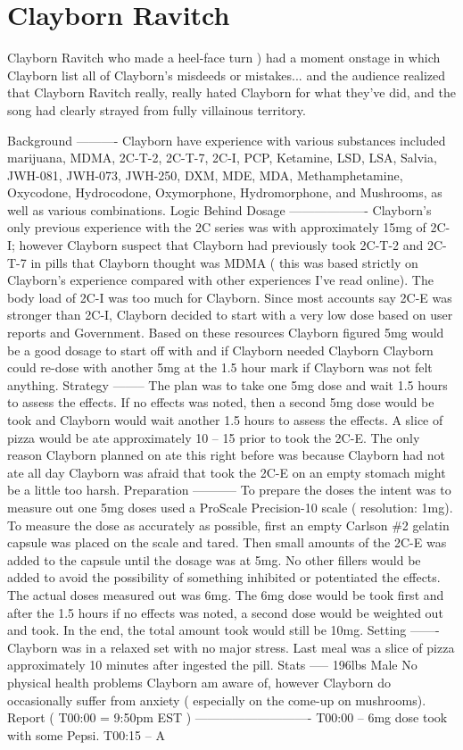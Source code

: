 \documentclass[12pt]{book}
\begin{document}
\chapter{Clayborn Ravitch}

Clayborn Ravitch who made a heel-face turn ) had a moment onstage in which Clayborn list all of Clayborn's misdeeds or mistakes... and the audience realized that Clayborn Ravitch really, really hated Clayborn for what they've did, and the song had clearly strayed from fully villainous territory.



Background ---------- Clayborn have experience with various substances included marijuana, MDMA, 2C-T-2, 2C-T-7, 2C-I, PCP, Ketamine, LSD, LSA, Salvia, JWH-081, JWH-073, JWH-250, DXM, MDE, MDA, Methamphetamine, Oxycodone, Hydrocodone, Oxymorphone, Hydromorphone, and Mushrooms, as well as various combinations. Logic Behind Dosage ------------------- Clayborn's only previous experience with the 2C series was with approximately 15mg of 2C-I; however Clayborn suspect that Clayborn had previously took 2C-T-2 and 2C-T-7 in pills that Clayborn thought was MDMA ( this was based strictly on Clayborn's experience compared with other experiences I've read online). The body load of 2C-I was too much for Clayborn. Since most accounts say 2C-E was stronger than 2C-I, Clayborn decided to start with a very low dose based on user reports and Government. Based on these resources Clayborn figured 5mg would be a good dosage to start off with and if Clayborn needed Clayborn Clayborn could re-dose with another 5mg at the 1.5 hour mark if Clayborn was not felt anything. Strategy -------- The plan was to take one 5mg dose and wait 1.5 hours to assess the effects. If no effects was noted, then a second 5mg dose would be took and Clayborn would wait another 1.5 hours to assess the effects. A slice of pizza would be ate approximately 10 -- 15 prior to took the 2C-E. The only reason Clayborn planned on ate this right before was because Clayborn had not ate all day Clayborn was afraid that took the 2C-E on an empty stomach might be a little too harsh. Preparation ----------- To prepare the doses the intent was to measure out one 5mg doses used a ProScale Precision-10 scale ( resolution: 1mg). To measure the dose as accurately as possible, first an empty Carlson \#2 gelatin capsule was placed on the scale and tared. Then small amounts of the 2C-E was added to the capsule until the dosage was at 5mg. No other fillers would be added to avoid the possibility of something inhibited or potentiated the effects. The actual doses measured out was 6mg. The 6mg dose would be took first and after the 1.5 hours if no effects was noted, a second dose would be weighted out and took. In the end, the total amount took would still be 10mg. Setting ------- Clayborn was in a relaxed set with no major stress. Last meal was a slice of pizza approximately 10 minutes after ingested the pill. Stats ----- 196lbs Male No physical health problems Clayborn am aware of, however Clayborn do occasionally suffer from anxiety ( especially on the come-up on mushrooms). Report ( T00:00 = 9:50pm EST ) ---------------------------- T00:00 -- 6mg dose took with some Pepsi. T00:15 -- A 
\end{document}
